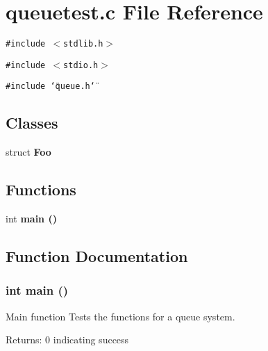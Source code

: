\section{queuetest.c File Reference}
\label{queuetest_8c}
{\tt \#include $<$stdlib.h$>$}\par
{\tt \#include $<$stdio.h$>$}\par
{\tt \#include \char`\"{}queue.h\char`\"{}}\par
\subsection*{Classes}
\begin{CompactItemize}
\item 
struct \bf{Foo}
\end{CompactItemize}
\subsection*{Functions}
\begin{CompactItemize}
\item 
int \bf{main} ()
\end{CompactItemize}


\subsection{Function Documentation}
\subsubsection{\setlength{\rightskip}{0pt plus 5cm}int main ()}\label{queuetest_8c_446c6b9a1a4dbab517fbb760870458a3}


Main function Tests the functions for a queue system. \begin{Desc}
\item[Returns:]0 indicating success \end{Desc}
